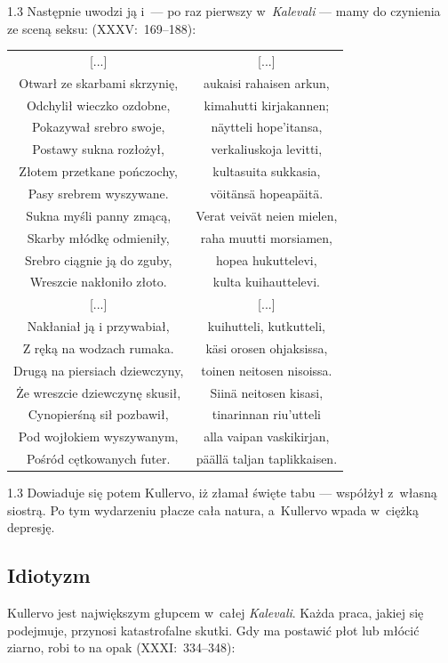 \documentclass[11pt,a4paper,twoside]{report}
\begin{document}
\begin{spacing}{1.3}
Następnie uwodzi ją i~--- po raz pierwszy w~\emph{Kalevali} --- mamy do czynienia ze sceną seksu: (XXXV:~169--188):
\end{spacing}
{\centering
\small
\begin{longtable}{c c}
{[...]} & {[...]} \\
Otwarł ze skarbami skrzynię, & aukaisi rahaisen arkun, \\
Odchylił wieczko ozdobne, & kimahutti kirjakannen; \\
Pokazywał srebro swoje, & näytteli hope'itansa, \\
Postawy sukna rozłożył, & verkaliuskoja levitti, \\
Złotem przetkane pończochy, & kultasuita sukkasia, \\
Pasy srebrem wyszywane. & vöitänsä hopeapäitä. \\
Sukna myśli panny zmącą, & Verat veivät neien mielen, \\
Skarby młódkę odmieniły, & raha muutti morsiamen, \\
Srebro ciągnie ją do zguby, & hopea hukuttelevi, \\
Wreszcie nakłoniło złoto. & kulta kuihauttelevi. \\
{[...]} & {[...]} \\
Nakłaniał ją i przywabiał, & kuihutteli, kutkutteli, \\
Z ręką na wodzach rumaka. & käsi orosen ohjaksissa, \\
Drugą na piersiach dziewczyny, & toinen neitosen nisoissa. \\
Że wreszcie dziewczynę skusił, & Siinä neitosen kisasi, \\
Cynopierśną sił pozbawił, & tinarinnan riu'utteli \\
Pod wojłokiem wyszywanym, & alla vaipan vaskikirjan, \\
Pośród cętkowanych futer. & päällä taljan taplikkaisen. \\
\end{longtable}
}
\begin{spacing}{1.3}
Dowiaduje się potem Kullervo, iż złamał święte tabu --- współżył z~własną siostrą. Po tym wydarzeniu płacze cała natura, a~Kullervo wpada w~ciężką depresję.

\newpage
\subsection*{Idiotyzm}
Kullervo jest największym głupcem w~całej \emph{Kalevali}. Każda praca, jakiej się podejmuje, przynosi katastrofalne skutki. Gdy ma postawić płot lub młócić ziarno, robi to na opak (XXXI:~334--348):
\end{spacing}
\end{document}
